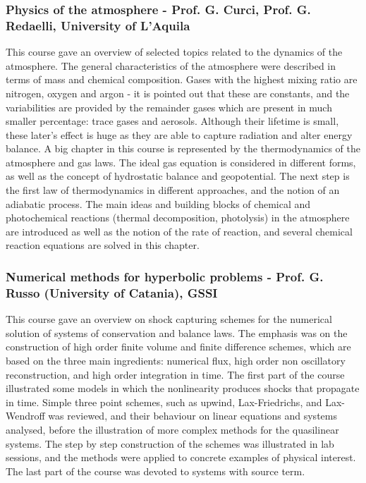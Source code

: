 \documentclass{article}
\begin{document}
\subsubsection{Physics of the atmosphere - Prof. G. Curci, Prof. G. Redaelli, University of L'Aquila}

This course gave an overview of selected topics related to the dynamics of the atmosphere. The general characteristics of the atmosphere were described in terms of mass and chemical composition. Gases with the highest mixing ratio are nitrogen, oxygen and argon - it is pointed out that these are constants, and the variabilities are provided by the remainder gases which are present in much smaller percentage: trace gases and aerosols. Although their lifetime is small, these later's effect is huge as they are able to capture radiation and alter energy balance. A big chapter in this course is represented by the thermodynamics of the atmosphere and gas laws. The ideal gas equation is considered in different forms, as well as the concept of hydrostatic balance and geopotential. The next step is the first law of thermodynamics in different approaches, and the notion of an adiabatic process. The main ideas and building blocks of chemical and photochemical reactions (thermal decomposition, photolysis) in the atmosphere are introduced as well as the notion of the rate of reaction, and several chemical reaction equations are solved in this chapter.

\subsubsection{Numerical methods for hyperbolic problems - Prof. G. Russo (University of Catania), GSSI}

This course gave an overview on shock capturing schemes for the numerical solution of systems of conservation and balance laws. The emphasis was on the construction of high order finite volume and finite difference schemes, which are based on the three main ingredients: numerical flux, high order non oscillatory reconstruction, and high order integration in time. The first part of the course illustrated some models in which the nonlinearity produces shocks that propagate in time. Simple three point schemes, such as upwind, Lax-Friedrichs, and Lax-Wendroff was reviewed, and their behaviour on linear equations and systems analysed, before the illustration of more complex methods for the quasilinear systems. The step by step construction of the schemes was illustrated in lab sessions, and the methods were applied to concrete examples of physical interest. The last part of the course was devoted to systems with source term.
\end{document}
